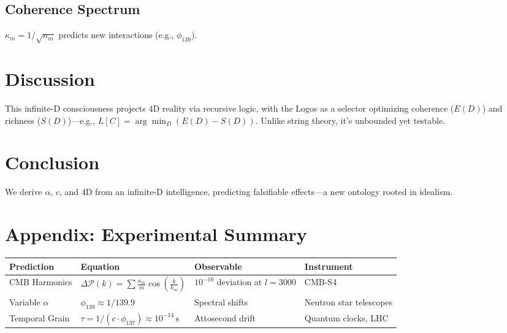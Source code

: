 \documentclass[12pt]{article}
\begin{document}
\subsection{Coherence Spectrum}
\(\kappa_m = 1/\sqrt{n_m}\) predicts new interactions (e.g., \(\phi_{139}\)).

\section{Discussion}

This infinite-D consciousness projects 4D reality via recursive logic, with the Logos as a selector optimizing coherence (\(E(D)\)) and richness (\(S(D)\))—e.g., \(L[C] = \arg\min_D (E(D) - S(D))\). Unlike string theory, it’s unbounded yet testable.

\section{Conclusion}

We derive \(\alpha\), \(c\), and 4D from an infinite-D intelligence, predicting falsifiable effects—a new ontology rooted in idealism.

\section*{Appendix: Experimental Summary}
\begin{tabularx}{\textwidth}{|l|X|l|l|}
\hline
\textbf{Prediction} & \textbf{Equation} & \textbf{Observable} & \textbf{Instrument} \\
\hline
CMB Harmonics & \(\Delta \mathcal{P}(k) = \sum \frac{\kappa_m}{m} \cos\left(\frac{k}{k_m}\right)\) & \(10^{-10}\) deviation at \(l = 3000\) & CMB-S4 \\
\hline
Variable \(\alpha\) & \(\phi_{139} \approx 1/139.9\) & Spectral shifts & Neutron star telescopes \\
\hline
Temporal Grain & \(\tau = 1/(c \cdot \phi_{137}) \approx 10^{-14} \, \text{s}\) & Attosecond drift & Quantum clocks, LHC \\
\hline
\end{tabularx}
\end{document}
